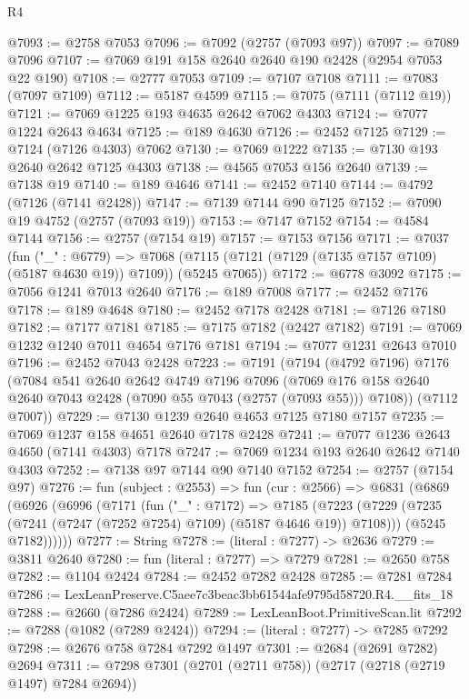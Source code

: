 \begin{lexlean}{R4}
\begin{coremodule}
@7093 := @2758 @7053
@7096 := @7092 (@2757 (@7093 @97))
@7097 := @7089 @7096
@7107 := @7069 @191 @158 @2640 @2640 @190 @2428 (@2954 @7053 @22 @190)
@7108 := @2777 @7053
@7109 := @7107 @7108
@7111 := @7083 (@7097 @7109)
@7112 := @5187 @4599
@7115 := @7075 (@7111 (@7112 @19))
@7121 := @7069 @1225 @193 @4635 @2642 @7062 @4303
@7124 := @7077 @1224 @2643 @4634
@7125 := @189 @4630
@7126 := @2452 @7125
@7129 := @7124 (@7126 @4303) @7062
@7130 := @7069 @1222
@7135 := @7130 @193 @2640 @2642 @7125 @4303
@7138 := @4565 @7053 @156 @2640
@7139 := @7138 @19
@7140 := @189 @4646
@7141 := @2452 @7140
@7144 := @4792 (@7126 (@7141 @2428))
@7147 := @7139 @7144 @90 @7125
@7152 := @7090 @19 @4752 (@2757 (@7093 @19))
@7153 := @7147 @7152
@7154 := @4584 @7144
@7156 := @2757 (@7154 @19)
@7157 := @7153 @7156
@7171 := @7037
    (fun ("_" : @6779) =>
    @7068 (@7115 (@7121 (@7129 (@7135 @7157 @7109) (@5187 @4630 @19)) @7109)) (@5245 @7065))
@7172 := @6778 @3092
@7175 := @7056 @1241 @7013 @2640
@7176 := @189 @7008
@7177 := @2452 @7176
@7178 := @189 @4648
@7180 := @2452 @7178 @2428
@7181 := @7126 @7180
@7182 := @7177 @7181
@7185 := @7175 @7182 (@2427 @7182)
@7191 := @7069 @1232 @1240 @7011 @4654 @7176 @7181
@7194 := @7077 @1231 @2643 @7010
@7196 := @2452 @7043 @2428
@7223 := @7191
    (@7194
      (@4792 @7196)
      @7176
      (@7084
        @541
        @2640
        @2642
        @4749
        @7196
        @7096
        (@7069 @176 @158 @2640 @2640 @7043 @2428 (@7090 @55 @7043 (@2757 (@7093 @55))) @7108))
      (@7112 @7007))
@7229 := @7130 @1239 @2640 @4653 @7125 @7180 @7157
@7235 := @7069 @1237 @158 @4651 @2640 @7178 @2428
@7241 := @7077 @1236 @2643 @4650 (@7141 @4303) @7178
@7247 := @7069 @1234 @193 @2640 @2642 @7140 @4303
@7252 := @7138 @97 @7144 @90 @7140 @7152
@7254 := @2757 (@7154 @97)
@7276 := fun (subject : @2553) =>
  fun (cur : @2566) =>
  @6831
    (@6869
      (@6926
        (@6996
          (@7171
            (fun ("_" : @7172) =>
            @7185
              (@7223 (@7229 (@7235 (@7241 (@7247 (@7252 @7254) @7109) (@5187 @4646 @19)) @7108)))
              (@5245 @7182))))))
@7277 := String
@7278 := (literal : @7277) -> @2636
@7279 := @3811 @2640
@7280 := fun (literal : @7277) => @7279
@7281 := @2650 @758
@7282 := @1104 @2424
@7284 := @2452 @7282 @2428
@7285 := @7281 @7284
@7286 := LexLeanPreserve.C5aee7c3beac3bb61544afe9795d58720.R4.__fits_18
@7288 := @2660 (@7286 @2424)
@7289 := LexLeanBoot.PrimitiveScan.lit
@7292 := @7288 (@1082 (@7289 @2424))
@7294 := (literal : @7277) -> @7285 @7292
@7298 := @2676 @758 @7284 @7292 @1497
@7301 := @2684 (@2691 @7282) @2694
@7311 := @7298 @7301 (@2701 (@2711 @758)) (@2717 (@2718 (@2719 @1497) @7284 @2694))

\end{coremodule}
\end{lexlean}

